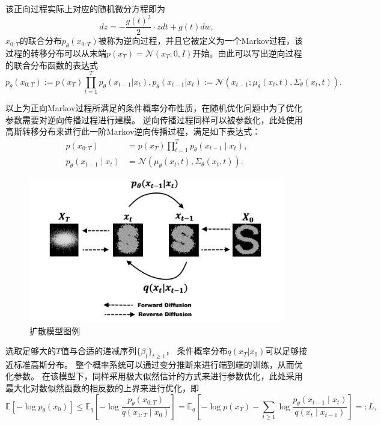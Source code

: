 该正向过程实际上对应的随机微分方程即为
\begin{equation}
    dz = -\frac{g(t)^2}{2}\cdot  z dt + g(t)dw,
\end{equation}
$x_{0:T}$的联合分布$p_{\theta}(x_{0:T})$被称为逆向过程，并且它被定义为一个Markov过程，该过程的转移分布可以从末端$p(x_T)= \mathcal{N}(x_T;0,I) $开始。由此可以写出逆向过程的联合分布函数的表达式
\begin{equation}
    p_{\theta}(x_{0:T}) := p(x_T)\prod_{t=1}^{T}p_{\theta}(x_{t-1}|x_t), p_{\theta}(x_{t-1}|x_t) :=\mathcal{N}(x_{t-1};\mu_{\theta}(x_t,t),\Sigma_{\theta}(x_t,t)).  
\end{equation}

以上为正向Markov过程所满足的条件概率分布性质，在随机优化问题中为了优化参数需要对逆向传播过程进行建模。
逆向传播过程同样可以被参数化，此处使用高斯转移分布来进行此一阶Markov逆向传播过程，满足如下表达式：
\begin{align}
    p\left(x_{0: T}\right)&=p\left(x_T\right) \prod_{t=1}^T p_\theta\left(x_{t-1} \mid x_t\right),\\
        p_\theta\left(x_{t-1} \mid x_t\right)&=\mathcal{N}\left(\mu_\theta\left(x_t, t\right), \Sigma_\theta\left(x_t, t\right)\right).
        \end{align}
        \begin{figure}[H]
            \centering
            \includegraphics[scale = 0.2]{Picture/Diffusion.png}
            \caption{扩散模型图例}
            \label{Diffusion}
        \end{figure}
选取足够大的$T$值与合适的递减序列$\{\beta_t\}_{t\geq 1}$， 条件概率分布$q(x_{T}|x_0)$可以足够接近标准高斯分布。
整个概率系统可以通过变分推断来进行端到端的训练，从而优化参数。
在该模型下，同样采用极大似然估计的方式来进行参数优化，此处采用最大化对数似然函数的相反数的上界来进行优化，即
\begin{equation}
    \mathbb{E}\left[-\log p_\theta\left({x}_0\right)\right] \leq \mathbb{E}_q\left[-\log \frac{p_\theta\left({x}_{0: T}\right)}{q\left({x}_{1: T} \mid {x}_0\right)}\right]=\mathbb{E}_q\left[-\log p\left({x}_T\right)-\sum_{t \geq 1} \log \frac{p_\theta\left({x}_{t-1} \mid {x}_t\right)}{q\left({x}_t \mid {x}_{t-1}\right)}\right]=: L,
    \label{DDPM objective 1}
\end{equation}
